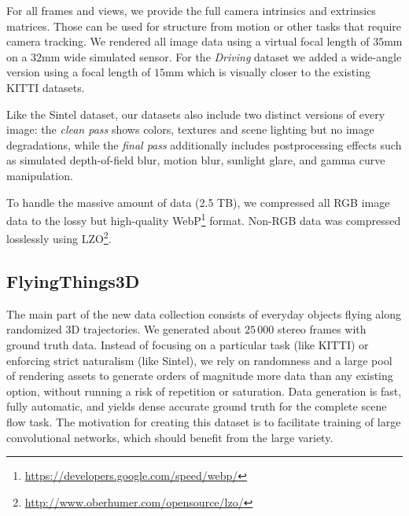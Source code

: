 \documentclass[10pt,twocolumn,letterpaper]{article}
\begin{document}
For all frames and views, we provide the full camera intrinsics and extrinsics matrices. 
Those can be used for structure from motion or other tasks that require camera tracking.
We rendered all image data using a virtual focal length of $35$mm on a $32$mm wide simulated sensor.
For the \emph{Driving} dataset we added a wide-angle version using a focal length of $15$mm which is visually closer to the existing KITTI datasets.

Like the Sintel dataset, our datasets also include two distinct versions of every image: the \emph{clean pass} shows colors, textures and scene lighting but no image degradations, while the \emph{final pass} additionally includes postprocessing effects such as simulated depth-of-field blur, motion blur, sunlight glare, and gamma curve manipulation.

To handle the massive amount of data (2.5 TB), we compressed all RGB image data to the lossy but high-quality  WebP\footnote{\url{https://developers.google.com/speed/webp/}} format.
Non-RGB data was compressed losslessly using LZO\footnote{\url{http://www.oberhumer.com/opensource/lzo/}}.

\subsection{FlyingThings3D}\label{sec:flyingthings3d}

The main part of the new data collection consists of everyday objects flying along randomized 3D trajectories.
We generated about $25\,000$ stereo frames with ground truth data.
Instead of focusing on a particular task (like KITTI) or enforcing strict naturalism (like Sintel), we rely on randomness and a large pool of rendering assets to generate orders of magnitude more data than any existing option, without running a risk of repetition or saturation.
Data generation is fast, fully automatic, and yields dense accurate ground truth for the complete scene flow task.
The motivation for creating this dataset is to facilitate training of large convolutional networks, which should benefit from the large variety.
\end{document}
